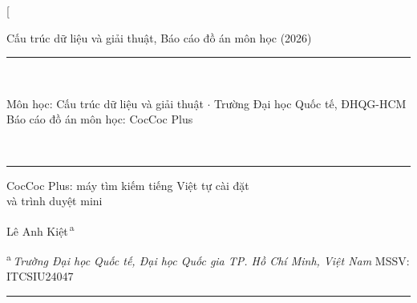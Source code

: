 \documentclass[9pt,twocolumn,a4paper]{extarticle}
\begin{document}
\thispagestyle{first}

\twocolumn[{%
\begin{@twocolumnfalse}
\vspace{-0.3cm}
\begin{center}\small\color{linkblue}Cấu trúc dữ liệu và giải thuật, Báo cáo đồ án môn học (2026)\end{center}
\vspace{-0.1cm}
\noindent\rule{\textwidth}{0.5pt}\\[-2pt]
\noindent\colorbox{bannergray}{\parbox{\dimexpr\textwidth-2\fboxsep}{\centering\vspace{3pt}
  {\small Môn học: Cấu trúc dữ liệu và giải thuật \;$\cdot$\; Trường Đại học Quốc tế, ĐHQG-HCM}\\[7pt]
  {\Large Báo cáo đồ án môn học: CocCoc Plus}\vspace{4pt}}}\\[-1pt]
\noindent\rule{\textwidth}{2.2pt}

\vspace{0.55cm}
{\fontsize{16.5}{20}\selectfont CocCoc Plus: máy tìm kiếm tiếng Việt tự cài đặt\\và trình duyệt mini\par}
\vspace{0.4cm}
{\large Lê Anh Kiệt\textsuperscript{\,a}\par}
\vspace{0.2cm}
{\scriptsize\textsuperscript{a}\,\textit{Trường Đại học Quốc tế, Đại học Quốc gia TP. Hồ Chí Minh, Việt Nam} \quad MSSV: ITCSIU24047\par}
\vspace{0.3cm}
\noindent\rule{\textwidth}{0.4pt}
\vspace{0.25cm}


\end{@twocolumnfalse}}
\end{document}
